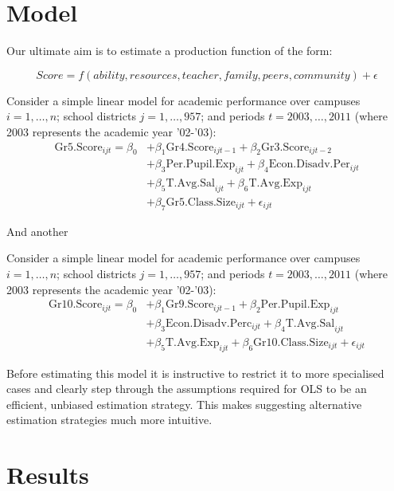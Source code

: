 \documentclass[11pt]{article}
\begin{document}
\section{Model}
\label{s:next}

Our ultimate aim is to estimate a production function of the form:

$$Score = f(ability,resources,teacher,family,peers,community) + \epsilon$$

Consider a simple linear model for academic performance over campuses $i=1,\ldots,n$; school districts $j=1,\ldots,957$; and periods $t=2003,\ldots,2011$ (where 2003 represents the academic year '02-'03):
\begin{align*}
\mathrm{Gr5.Score}_{ijt} = \beta_{0} 
    &+ \beta_{1}  \mathrm{Gr4.Score}_{ijt-1} 
    + \beta_{2}  \mathrm{Gr3.Score}_{ijt-2}    \\
    &+ \beta_{3}  \mathrm{Per.Pupil.Exp}_{ijt} 
    + \beta_{4}  \mathrm{Econ.Disadv.Per}_{ijt} \\
    &+ \beta_{5}  \mathrm{T.Avg.Sal}_{ijt}   
    + \beta_{6}  \mathrm{T.Avg.Exp}_{ijt}  \\
    &+ \beta_{7}  \mathrm{Gr5.Class.Size}_{ijt} + \epsilon_{ijt}
\end{align*}

And another

Consider a simple linear model for academic performance over campuses $i=1,\ldots,n$; school districts $j=1,\ldots,957$; and periods $t=2003,\ldots,2011$ (where 2003 represents the academic year '02-'03):
\begin{align*}
\mathrm{Gr10.Score}_{ijt} = \beta_{0} 
    &+ \beta_{1}  \mathrm{Gr9.Score}_{ijt-1} 
    + \beta_{2}  \mathrm{Per.Pupil.Exp}_{ijt} \\
    &+ \beta_{3}  \mathrm{Econ.Disadv.Perc}_{ijt} 
    + \beta_{4}  \mathrm{T.Avg.Sal}_{ijt}  \\
    &+ \beta_{5}  \mathrm{T.Avg.Exp}_{ijt}  
    + \beta_{6}  \mathrm{Gr10.Class.Size}_{ijt} + \epsilon_{ijt}
\end{align*}


Before estimating this model it is instructive to restrict it to more specialised cases and clearly step through the assumptions required for OLS to be an efficient, unbiased estimation strategy. This makes suggesting alternative estimation strategies much more intuitive.





\section{Results}
\end{document}
